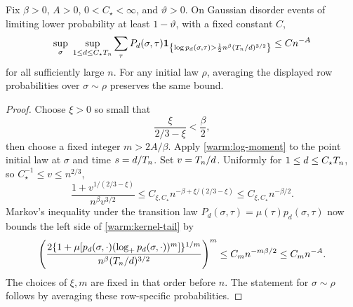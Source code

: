 \begin{corollary}
\label{warm:kernel-log-tail}
Fix \(\beta>0\), \(A>0\), \(0<C_\star<\infty\), and
\(\vartheta>0\).  On Gaussian disorder events of limiting lower
probability at least \(1-\vartheta\), with a fixed constant \(C\),
\begin{equation}
 \sup_{\sigma}\ \sup_{1\le d\le C_\star T_n}
 \sum_\tau P_d(\sigma,\tau)
 \mathbf 1_{\left\{\log p_d(\sigma,\tau)>
       \frac12 n^\beta(T_n/d)^{3/2}\right\}}
 \le Cn^{-A}                                                \label{warm:kernel-tail}
\end{equation}
for all sufficiently large \(n\).  For any initial law \(\rho\),
averaging the displayed row probabilities over \(\sigma\sim\rho\)
preserves the same bound.
\end{corollary}

\begin{proof}
Choose \(\xi>0\) so small that
\[
 \frac{\xi}{2/3-\xi}<\frac{\beta}{2},
\]
then choose a fixed integer \(m>2A/\beta\).  Apply
\eqref{warm:log-moment} to the point initial law at \(\sigma\)
and time \(s=d/T_n\).  Set \(v=T_n/d\).  Uniformly for
\(1\le d\le C_\star T_n\), so \(C_\star^{-1}\le v\le n^{2/3}\),
\[
 \frac{1+v^{1/(2/3-\xi)}}{n^\beta v^{3/2}}
 \le C_{\xi,C_\star}
       n^{-\beta+\xi/(2/3-\xi)}
 \le C_{\xi,C_\star}n^{-\beta/2}.
\]
Markov's inequality under the transition law
\(P_d(\sigma,\tau)=\mu(\tau)p_d(\sigma,\tau)\) now bounds the
left side of \eqref{warm:kernel-tail} by
\[
 \left(
 \frac{2\{1+\mu[p_d(\sigma,\cdot)
                  (\log_+p_d(\sigma,\cdot))^m]\}^{1/m}}
      {n^\beta(T_n/d)^{3/2}}\right)^m
 \le C_m n^{-m\beta/2}\le C_m n^{-A}.
\]
The choices of \(\xi,m\) are fixed in that order before \(n\).
The statement for \(\sigma\sim\rho\) follows by averaging these
row-specific probabilities.
\end{proof}
